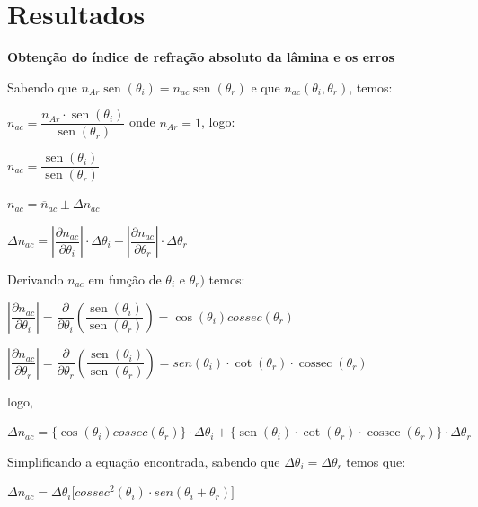 \documentclass[
	12pt,				%
	oneside,			%
	a4paper,			%
	english,			%
	french,				%
	spanish,			%
	brazil				%
	]{abntex2}
\DeclareMathOperator{\sen}{sen}
\DeclareMathOperator{\cossec}{cossec}
\begin{document}
\chapter{Resultados}
\begin{flushleft}
\textbf{Obtenção do índice de refração absoluto da lâmina e os erros}
\end{flushleft}

Sabendo que $n_{Ar}\sen(\theta_i) = n_{ac}\sen(\theta_r)$ e que $n_{ac}(\theta_i , \theta_r)$, temos:

\begin{flushleft}
$ n_{ac} = \dfrac{n_{Ar} \cdot \sen(\theta_i)}{\sen(\theta_r)}$ onde $n_{Ar} = 1$, logo:

 $ n_{ac} = \dfrac{\sen(\theta_i)}{\sen(\theta_r)}$

$ n_{ac} = \overline{n}_{ac} \pm \Delta n_{ac}$

$ \Delta n_{ac} = \left|\dfrac{\partial n_{ac}}{\partial \theta_i}\right| \cdot \Delta \theta_i + \left|\dfrac{\partial n_{ac}}{\partial \theta_r}\right| \cdot \Delta \theta_r$

Derivando $ n_{ac}$ em função de $\theta_i$ e $\theta_r)$ temos:

$\left|\dfrac{\partial n_{ac}}{\partial \theta_i}\right| = \dfrac{\partial}{\partial \theta_i} \left(\dfrac{\sen(\theta_i)}{\sen(\theta_r)}\right) = \cos(\theta_i)cossec(\theta_r)$

$\left|\dfrac{\partial n_{ac}}{\partial \theta_r}\right| = \dfrac{\partial}{\partial \theta_r} \left(\dfrac{\sen(\theta_i)}{\sen(\theta_r)}\right) = sen(\theta_i) \cdot \cot(\theta_r) \cdot \cossec(\theta_r)$

logo,

$\Delta n_{ac} = \{\cos(\theta_i)cossec(\theta_r)\} \cdot \Delta \theta_i + \{\sen(\theta_i) \cdot \cot(\theta_r) \cdot \cossec(\theta_r)\} \cdot \Delta \theta_r$

Simplificando a equação encontrada, sabendo que $\Delta \theta_i = \Delta \theta_r$ temos que:

$\Delta n_{ac} = \Delta \theta_i \lbrack cossec^2(\theta_i) \cdot sen(\theta_i + \theta_r) \rbrack$

\end{flushleft}
\end{document}
